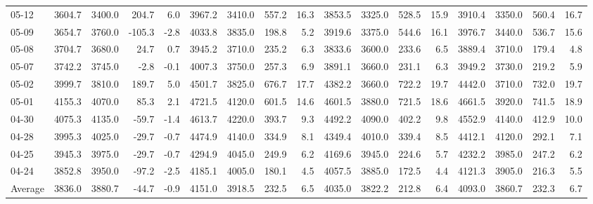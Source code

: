 \begin{threeparttable}
{\begin{tabular}{lrrrrrrrrrrrrrrrr}
  05-12 & 3604.7 & 3400.0 &      204.7 &            6.0 & 3967.2 & 3410.0 &      557.2 &           16.3 & 3853.5 & 3325.0 &      528.5 &           15.9 & 3910.4 & 3350.0 &       560.4 &             16.7 \\
  05-09 & 3654.7 & 3760.0 &     -105.3 &           -2.8 & 4033.8 & 3835.0 &      198.8 &            5.2 & 3919.6 & 3375.0 &      544.6 &           16.1 & 3976.7 & 3440.0 &       536.7 &             15.6 \\
  05-08 & 3704.7 & 3680.0 &       24.7 &            0.7 & 3945.2 & 3710.0 &      235.2 &            6.3 & 3833.6 & 3600.0 &      233.6 &            6.5 & 3889.4 & 3710.0 &       179.4 &              4.8 \\
  05-07 & 3742.2 & 3745.0 &       -2.8 &           -0.1 & 4007.3 & 3750.0 &      257.3 &            6.9 & 3891.1 & 3660.0 &      231.1 &            6.3 & 3949.2 & 3730.0 &       219.2 &              5.9 \\
  05-02 & 3999.7 & 3810.0 &      189.7 &            5.0 & 4501.7 & 3825.0 &      676.7 &           17.7 & 4382.2 & 3660.0 &      722.2 &           19.7 & 4442.0 & 3710.0 &       732.0 &             19.7 \\
  05-01 & 4155.3 & 4070.0 &       85.3 &            2.1 & 4721.5 & 4120.0 &      601.5 &           14.6 & 4601.5 & 3880.0 &      721.5 &           18.6 & 4661.5 & 3920.0 &       741.5 &             18.9 \\
  04-30 & 4075.3 & 4135.0 &      -59.7 &           -1.4 & 4613.7 & 4220.0 &      393.7 &            9.3 & 4492.2 & 4090.0 &      402.2 &            9.8 & 4552.9 & 4140.0 &       412.9 &             10.0 \\
  04-28 & 3995.3 & 4025.0 &      -29.7 &           -0.7 & 4474.9 & 4140.0 &      334.9 &            8.1 & 4349.4 & 4010.0 &      339.4 &            8.5 & 4412.1 & 4120.0 &       292.1 &              7.1 \\
  04-25 & 3945.3 & 3975.0 &      -29.7 &           -0.7 & 4294.9 & 4045.0 &      249.9 &            6.2 & 4169.6 & 3945.0 &      224.6 &            5.7 & 4232.2 & 3985.0 &       247.2 &              6.2 \\
  04-24 & 3852.8 & 3950.0 &      -97.2 &           -2.5 & 4185.1 & 4005.0 &      180.1 &            4.5 & 4057.5 & 3885.0 &      172.5 &            4.4 & 4121.3 & 3905.0 &       216.3 &              5.5 \\
Average & 3836.0 & 3880.7 &      -44.7 &           -0.9 & 4151.0 & 3918.5 &      232.5 &            6.5 & 4035.0 & 3822.2 &      212.8 &            6.4 & 4093.0 & 3860.7 &       232.3 &              6.7 \\

\end{tabular}}
\end{threeparttable}
